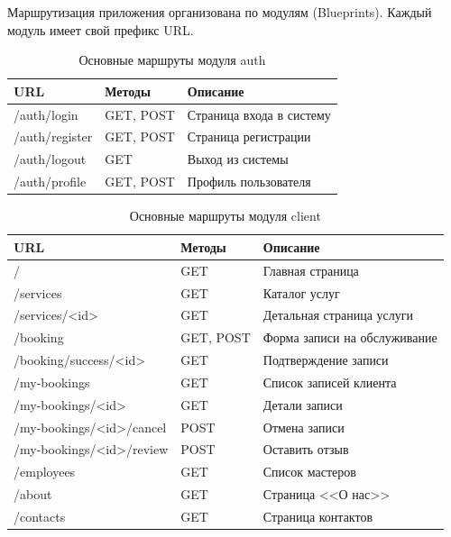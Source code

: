 \documentclass[14pt,a4paper,oneside]{extarticle}
\begin{document}
Маршрутизация приложения организована по модулям (Blueprints). Каждый модуль имеет свой префикс URL.

\begin{table}[H]
\caption{Основные маршруты модуля auth}\label{tab:routes_auth}
\centering
\begin{tabularx}{\textwidth}{|l|l|X|}
\hline
\textbf{URL} & \textbf{Методы} & \textbf{Описание} \\
\hline
/auth/login & GET, POST & Страница входа в систему \\
\hline
/auth/register & GET, POST & Страница регистрации \\
\hline
/auth/logout & GET & Выход из системы \\
\hline
/auth/profile & GET, POST & Профиль пользователя \\
\hline
\end{tabularx}
\end{table}

\begin{table}[H]
\caption{Основные маршруты модуля client}\label{tab:routes_client}
\centering
\begin{tabularx}{\textwidth}{|l|l|X|}
\hline
\textbf{URL} & \textbf{Методы} & \textbf{Описание} \\
\hline
/ & GET & Главная страница \\
\hline
/services & GET & Каталог услуг \\
\hline
/services/<id> & GET & Детальная страница услуги \\
\hline
/booking & GET, POST & Форма записи на обслуживание \\
\hline
/booking/success/<id> & GET & Подтверждение записи \\
\hline
/my-bookings & GET & Список записей клиента \\
\hline
/my-bookings/<id> & GET & Детали записи \\
\hline
/my-bookings/<id>/cancel & POST & Отмена записи \\
\hline
/my-bookings/<id>/review & POST & Оставить отзыв \\
\hline
/employees & GET & Список мастеров \\
\hline
/about & GET & Страница <<О нас>> \\
\hline
/contacts & GET & Страница контактов \\
\hline
\end{tabularx}
\end{table}
\end{document}
